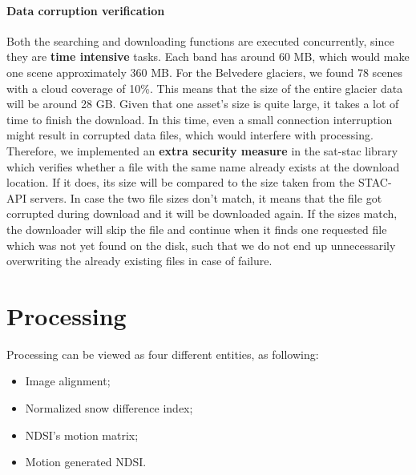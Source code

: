 \documentclass[12pt, a4paper]{report}
\begin{document}
	\paragraph{Data corruption verification}
	Both the searching and downloading functions are executed concurrently, since they are \textbf{time intensive} tasks. Each band has around 60 MB, which would make one scene approximately 360 MB. For the Belvedere glaciers, we found 78 scenes with a cloud coverage of 10\%. This means that the size of the entire glacier data will be around 28 GB. Given that one asset's size is quite large, it takes a lot of time to finish the download. In this time, even a small connection interruption might result in corrupted data files, which would interfere with processing. Therefore, we implemented an \textbf{extra security measure} in the sat-stac library which verifies whether a file with the same name already exists at the download location. If it does, its size will be compared to the size taken from the STAC-API servers. In case the two file sizes don't match, it means that the file got corrupted during download and it will be downloaded again. If the sizes match, the downloader will skip the file and continue when it finds one requested file which was not yet found on the disk, such that we do not end up unnecessarily overwriting the already existing files in case of failure.
	

	\section{Processing}
	\label{seq:processing}
	
	\par Processing can be viewed as four different entities, as following:
	
	\begin{itemize}
		\item Image alignment;
		\item Normalized snow difference index;
		\item NDSI's motion matrix;
		\item Motion generated NDSI.
	\end{itemize}
\end{document}

